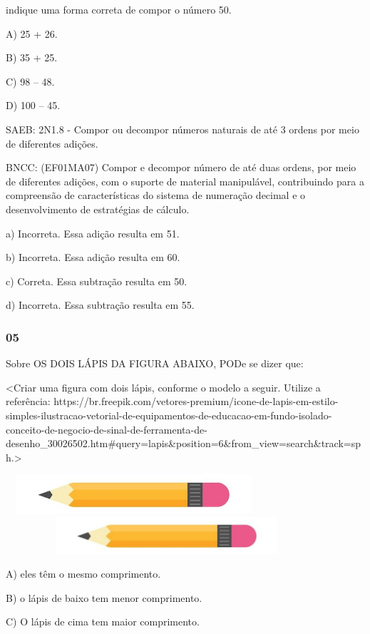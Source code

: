 indique uma forma correta de compor o número 50.

A) 25 + 26.

B) 35 + 25.

C) 98 -- 48.

D) 100 -- 45.

SAEB: 2N1.8 - Compor ou decompor números naturais de até 3 ordens por
meio de diferentes adições.

BNCC: (EF01MA07) Compor e decompor número de até duas ordens, por meio
de diferentes adições, com o suporte de material manipulável,
contribuindo para a compreensão de características do sistema de
numeração decimal e o desenvolvimento de estratégias de cálculo.

a) Incorreta. Essa adição resulta em 51.

b) Incorreta. Essa adição resulta em 60.

c) Correta. Essa subtração resulta em 50.

d) Incorreta. Essa subtração resulta em 55.

\subsubsection{05}\label{section-91}

Sobre OS DOIS LÁPIS DA FIGURA ABAIXO, PODe se dizer que:

\textless{}Criar uma figura com dois lápis, conforme o modelo a seguir.
Utilize a referência:
https://br.freepik.com/vetores-premium/icone-de-lapis-em-estilo-simples-ilustracao-vetorial-de-equipamentos-de-educacao-em-fundo-isolado-conceito-de-negocio-de-sinal-de-ferramenta-de-desenho\_30026502.htm\#query=lapis\&position=6\&from\_view=search\&track=sph.\textgreater{}

\includegraphics[width=3.74118in,height=0.57310in]{media/image29.jpg}\includegraphics[width=4.71287in,height=0.53673in]{media/image29.jpg}

A) eles têm o mesmo comprimento.

B) o lápis de baixo tem menor comprimento.

C) O lápis de cima tem maior comprimento.

